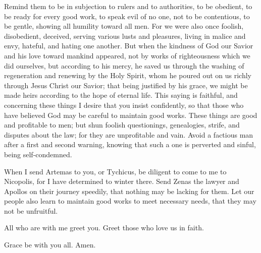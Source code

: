  Remind them to be in subjection to rulers and to
authorities, to be obedient, to be ready for every good work,
 to speak evil of no one, not to be contentious, to be
gentle, showing all humility toward all men.  For we were
also once foolish, disobedient, deceived, serving various lusts and
pleasures, living in malice and envy, hateful, and hating one another.
 But when the kindness of God our Savior and his love toward
mankind appeared,  not by works of righteousness which we
did ourselves, but according to his mercy, he saved us through the
washing of regeneration and renewing by the Holy Spirit, 
whom he poured out on us richly through Jesus Christ our Savior;
 that being justified by his grace, we might be made heirs
according to the hope of eternal life.  This saying is
faithful, and concerning these things I desire that you insist
confidently, so that those who have believed God may be careful to
maintain good works. These things are good and profitable to men;
 but shun foolish questionings, genealogies, strife, and
disputes about the law; for they are unprofitable and vain.
 Avoid a factious man after a first and second warning,
 knowing that such a one is perverted and sinful, being
self-condemned.

 When I send Artemas to you, or Tychicus, be diligent to
come to me to Nicopolis, for I have determined to winter there.
 Send Zenas the lawyer and Apollos on their journey
speedily, that nothing may be lacking for them.  Let our
people also learn to maintain good works to meet necessary needs, that
they may not be unfruitful.

 All who are with me greet you. Greet those who love us in
faith.

Grace be with you all. Amen.
